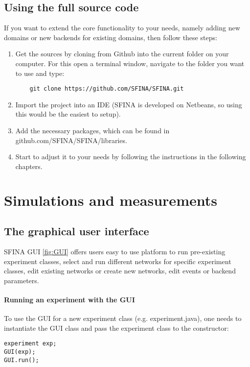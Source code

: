\documentclass[11pt,fleqn]{book} %
\newcommand{\backend}[1][]{backend#1}
\newcommand{\domain}[1][]{domain#1}
\begin{document}
\subsection{Using the full source code}
If you want to extend the core functionality to your needs, namely adding new \domain{s} or new \backend{s} for existing \domain{s}, then follow these steps:
\begin{enumerate}
	\item Get the sources by cloning from Github into the current folder on your computer. For this open a terminal window, navigate to the folder you want to use and type: 
	\begin{lstlisting}
	git clone https://github.com/SFINA/SFINA.git
	\end{lstlisting}
	\item Import the project into an IDE (SFINA is developed on Netbeans, so using this would be the easiest to setup).
	\item Add the necessary packages, which can be found in github.com/SFINA/SFINA/libraries.
	\item Start to adjust it to your needs by following the instructions in the following chapters.
\end{enumerate}

\section{Simulations and measurements}
\subsection{The graphical user interface}\label{sec:GUI}
SFINA GUI \ref{fig:GUI} offers users easy to use platform to run pre-existing experiment classes, select and run different networks for specific experiment classes, edit existing networks or create new networks, edit events or backend parameters. 

\paragraph{Running an experiment with the GUI} To use the GUI for a new experiment class (e.g. experiment.java), one needs to instantiate the GUI class and pass the experiment class to the constructor:
\begin{lstlisting}[frame=single] 
experiment exp;
GUI(exp);
GUI.run();
\end{lstlisting}
\end{document}
